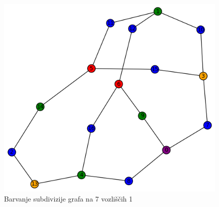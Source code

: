 \documentclass[11pt,a4paper,titlepage]{article}
\begin{document}
\begin{figure}[H]
\begin{minipage}{0.45\textwidth}
		\includegraphics[width=\linewidth]{sub_7_1.png}
		\caption{Barvanje subdivizije grafa na 7 vozliščih 1}
	\end{minipage}
\end{figure}
\end{document}

